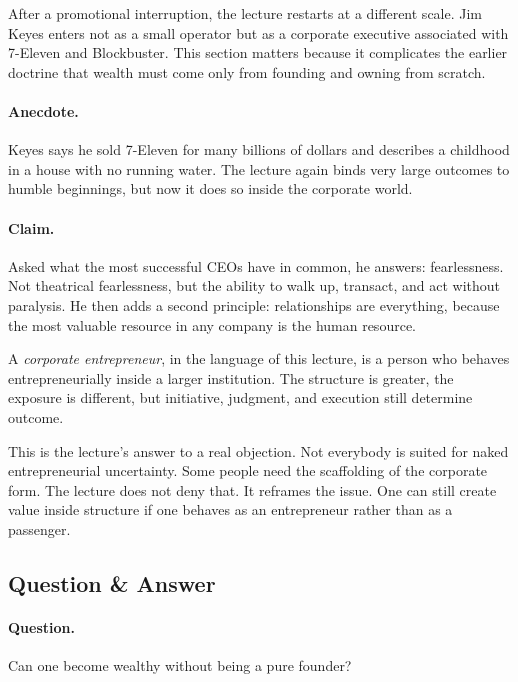 After a promotional interruption, the lecture restarts at a different scale. Jim Keyes enters not as a small operator but as a corporate executive associated with 7-Eleven and Blockbuster. This section matters because it complicates the earlier doctrine that wealth must come only from founding and owning from scratch.

\paragraph{Anecdote.} Keyes says he sold 7-Eleven for many billions of dollars and describes a childhood in a house with no running water. The lecture again binds very large outcomes to humble beginnings, but now it does so inside the corporate world.

\paragraph{Claim.} Asked what the most successful CEOs have in common, he answers: fearlessness. Not theatrical fearlessness, but the ability to walk up, transact, and act without paralysis. He then adds a second principle: relationships are everything, because the most valuable resource in any company is the human resource.

\begin{definition}
A \emph{corporate entrepreneur}, in the language of this lecture, is a person who behaves entrepreneurially inside a larger institution. The structure is greater, the exposure is different, but initiative, judgment, and execution still determine outcome.
\end{definition}

This is the lecture's answer to a real objection. Not everybody is suited for naked entrepreneurial uncertainty. Some people need the scaffolding of the corporate form. The lecture does not deny that. It reframes the issue. One can still create value inside structure if one behaves as an entrepreneur rather than as a passenger.

\subsection{Question \& Answer}

\paragraph{Question.} Can one become wealthy without being a pure founder?

